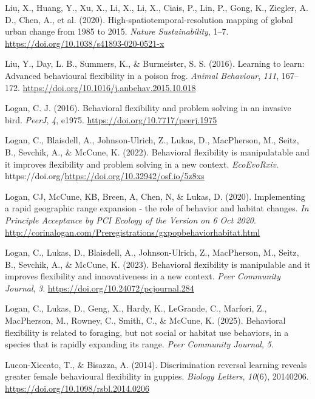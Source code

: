 \documentclass[
]{article}
\newlength{\cslhangindent}
\newenvironment{CSLReferences}[2] %
 {\begin{list}{}{%
  \setlength{\itemindent}{0pt}
  \setlength{\leftmargin}{0pt}
  \setlength{\parsep}{0pt}
  \ifodd #1
   \setlength{\leftmargin}{\cslhangindent}
   \setlength{\itemindent}{-1\cslhangindent}
  \fi
  \setlength{\itemsep}{#2\baselineskip}}}
 {\end{list}}
\begin{document}
\begin{CSLReferences}{1}{0}
{Liu, X., Huang, Y., Xu, X., Li, X., Li, X., Ciais, P., Lin, P., Gong,
K., Ziegler, A. D., Chen, A., et al.} (2020).
High-spatiotemporal-resolution mapping of global urban change from 1985
to 2015. \emph{Nature Sustainability}, 1--7.
\url{https://doi.org/10.1038/s41893-020-0521-x}

Liu, Y., Day, L. B., Summers, K., \& Burmeister, S. S. (2016). Learning
to learn: Advanced behavioural flexibility in a poison frog.
\emph{Animal Behaviour}, \emph{111}, 167--172.
\url{https://doi.org/10.1016/j.anbehav.2015.10.018}

Logan, C. J. (2016). Behavioral flexibility and problem solving in an
invasive bird. \emph{PeerJ}, \emph{4}, e1975.
\url{https://doi.org/10.7717/peerj.1975}

Logan, C., Blaisdell, A., Johnson-Ulrich, Z., Lukas, D., MacPherson, M.,
Seitz, B., Sevchik, A., \& McCune, K. (2022). Behavioral flexibility is
manipulatable and it improves flexibility and problem solving in a new
context. \emph{EcoEvoRxiv}.
https://doi.org/\url{https://doi.org/10.32942/osf.io/5z8xs}

Logan, CJ, McCune, KB, Breen, A, Chen, N, \& Lukas, D. (2020).
Implementing a rapid geographic range expansion - the role of behavior
and habitat changes. \emph{In Principle Acceptance by PCI Ecology of the
Version on 6 Oct 2020}.
\url{http://corinalogan.com/Preregistrations/gxpopbehaviorhabitat.html}

Logan, C., Lukas, D., Blaisdell, A., Johnson-Ulrich, Z., MacPherson, M.,
Seitz, B., Sevchik, A., \& McCune, K. (2023). Behavioral flexibility is
manipulable and it improves flexibility and innovativeness in a new
context. \emph{Peer Community Journal}, \emph{3}.
\url{https://doi.org/10.24072/pcjournal.284}

Logan, C., Lukas, D., Geng, X., Hardy, K., LeGrande, C., Marfori, Z.,
MacPherson, M., Rowney, C., Smith, C., \& McCune, K. (2025). Behavioral
flexibility is related to foraging, but not social or habitat use
behaviors, in a species that is rapidly expanding its range. \emph{Peer
Community Journal}, \emph{5}.

Lucon-Xiccato, T., \& Bisazza, A. (2014). Discrimination reversal
learning reveals greater female behavioural flexibility in guppies.
\emph{Biology Letters}, \emph{10}(6), 20140206.
\url{https://doi.org/10.1098/rsbl.2014.0206}


\end{CSLReferences}
\end{document}
